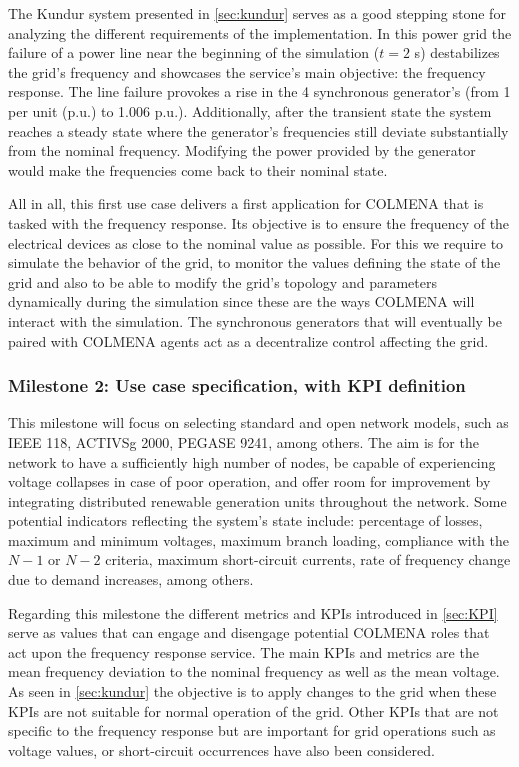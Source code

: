 \documentclass{article}
\begin{document}
The Kundur system presented in \ref{sec:kundur} serves as a good stepping stone for analyzing the different requirements of the implementation. In this power grid the failure of a power line near the beginning of the simulation ($t = 2$ s) destabilizes the grid's frequency and showcases the service's main objective: the frequency response. The line failure provokes a rise in the 4 synchronous generator's (from 1 per unit (p.u.) to 1.006 p.u.). Additionally, after the transient state the system reaches a steady state where the generator's frequencies still deviate substantially from the nominal frequency. Modifying the power provided by the generator would make the frequencies come back to their nominal state.

All in all, this first use case delivers a first application for COLMENA that is tasked with the frequency response. Its objective is to ensure the frequency of the electrical devices as close to the nominal value as possible. For this we require to simulate the behavior of the grid, to monitor the values defining the state of the grid and also to be able to modify the grid's topology and parameters dynamically during the simulation since these are the ways COLMENA will interact with the simulation. The synchronous generators that will eventually be paired with COLMENA agents act as a decentralize control affecting the grid. 

\subsubsection*{Milestone 2: Use case specification, with KPI definition}

This milestone will focus on selecting standard and open network models, such as IEEE 118, ACTIVSg 2000, PEGASE 9241, among others. The aim is for the network to have a sufficiently high number of nodes, be capable of experiencing voltage collapses in case of poor operation, and offer room for improvement by integrating distributed renewable generation units throughout the network. Some potential indicators reflecting the system's state include: percentage of losses, maximum and minimum voltages, maximum branch loading, compliance with the $N - 1$ or $N - 2$ criteria, maximum short-circuit currents, rate of frequency change due to demand increases, among others.

Regarding this milestone the different metrics and KPIs introduced in \ref{sec:KPI} serve as values that can engage and disengage potential COLMENA roles that act upon the frequency response service. The main KPIs and metrics are the mean frequency deviation to the nominal frequency as well as the mean voltage. As seen in \ref{sec:kundur} the objective is to apply changes to the grid when these KPIs are not suitable for normal operation of the grid. Other KPIs that are not specific to the frequency response but are important for grid operations such as voltage values, or short-circuit occurrences have also been considered. 
\end{document}
